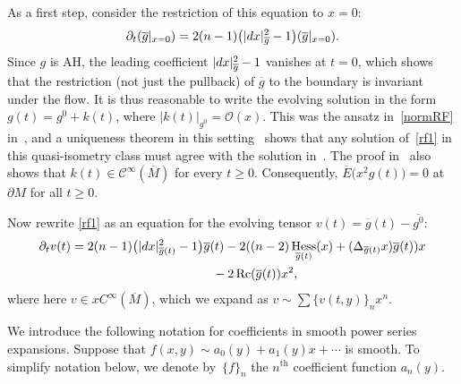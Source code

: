 \documentclass[11pt]{article}
\numberwithin{equation}{section}
\newcommand{\del}{\partial}
\newcommand{\olg}{\overline{g}}
\newcommand{\olgin}{\overline{\gin}}
\newcommand{\olE}{\overline{E}}
\newcommand{\calO}{\mathcal O}
\newcommand{\calC}{\mathcal C}
\newcommand{\gin}{{g^0}}
\newcommand{\gbar}{\overline{g}}
\newcommand{\Mbar}{\overline{M}}
\DeclareMathOperator{\Rc}{Rc}
\DeclareMathOperator{\hess}{Hess}
\begin{document}
As a first step, consider the restriction of this equation to $x = 0$:
\begin{gather*}%
 \del_t (\olg |_{x=0} ) = 2(n-1) \big( |{\rm d}x|_{\olg}^2 - 1\big) (\olg |_{x=0} ) .
\end{gather*}
Since $g$ is AH, the leading coefficient $|{\rm d}x|^2_{\olg} - 1$ vanishes at $t=0$, which shows that the restriction (not just the
pullback) of $\olg$ to the boundary is invariant under the flow. It is thus reasonable to write the evolving solution
in the form $g(t) = \gin + k(t)$, where $|k(t)|_{\gin} = \calO(x)$. This was the ansatz in~\eqref{normRF} in~\cite{Bahuaud}, and
a uniqueness theorem in this setting~\cite{Chen-Zhu} shows that any solution of~\eqref{rf1} in this quasi-isometry class
must agree with the solution in~\cite{Bahuaud}. The proof in~\cite{Bahuaud} also shows that $k(t) \in \calC^\infty(\overline{M})$
for every $t \geq 0$. Consequently, $\olE\big( x^2 g(t)\big) = 0 $ at $\del M$ for all $t \geq 0$.

Now rewrite \eqref{rf1} as an equation for the evolving tensor $v(t) = \olg(t) - \olgin$:
\begin{gather}
 \del_t v(t) = 2 (n-1) \big(|{\rm d}x|^2_{\gbar(t)} -1\big) \olg(t) -2 ( (n-2) \hess_{\olg(t)} (x) + (\Delta_{\olg(t)} x) \olg(t) ) x\nonumber\\
\hphantom{\del_t v(t) =}{} -2 \Rc(\gbar(t)) x^2, \label{rf2}
\end{gather}
where here $v \in x C^{\infty}(\Mbar)$, which we expand as $v \sim \sum \{ v(t,y) \}_n x^n$.

We introduce the following notation for coefficients in smooth power series expansions. Suppose that $f(x,y) \sim a_0(y) + a_1(y) x + \cdots$ is smooth. To simplify notation below, we denote by~$\{f\}_{n}$ the $n^{\mathrm{th}}$ coefficient function $a_n(y)$.
\end{document}
